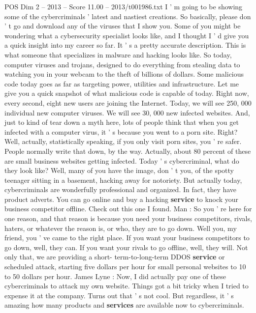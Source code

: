 \begin{textsample}{POS Dim 2 – 2013 – Score 11.00 – 2013/t001986.txt}  \label{ex:f2_pos_068}
I ' m going to be showing some of the cybercriminals ' latest and nastiest creations.
So basically, please don ' t go and download any of the viruses that I show you.
Some of you might be wondering what a cybersecurity specialist looks like, and I thought I ' d give you a quick insight into my career so far.
It ' s a pretty accurate description.
This is what someone that specializes in malware and hacking looks like.
So today, computer viruses and trojans, designed to do everything from stealing data to watching you in your webcam to the theft of billions of dollars.
Some malicious code today goes as far as targeting power, utilities and infrastructure.
Let me give you a quick snapshot of what malicious code is capable of today.
Right now, every second, eight new users are joining the Internet.
Today, we will see 250, 000 individual new computer viruses.
We will see 30, 000 new infected websites.
And, just to kind of tear down a myth here, lots of people think that when you get infected with a computer virus, it ' s because you went to a porn site.
Right?
Well, actually, statistically speaking, if you only visit porn sites, you ' re safer.
People normally write that down, by the way.
Actually, about 80 percent of these are small business websites getting infected.
Today ' s cybercriminal, what do they look like?
Well, many of you have the image, don ' t you, of the spotty teenager sitting in a basement, hacking away for notoriety.
But actually today, cybercriminals are wonderfully professional and organized.
In fact, they have product adverts.
You can go online and buy a hacking \textbf{service} to knock your business competitor offline.
Check out this one I found.
Man : So you ' re here for one reason, and that reason is because you need your business competitors, rivals, haters, or whatever the reason is, or who, they are to go down.
Well you, my friend, you ' ve came to the right place.
If you want your business competitors to go down, well, they can.
If you want your rivals to go offline, well, they will.
Not only that, we are providing a short- term-to-long-term DDOS \textbf{service} or scheduled attack, starting five dollars per hour for small personal websites to 10 to 50 dollars per hour.
James Lyne : Now, I did actually pay one of these cybercriminals to attack my own website.
Things got a bit tricky when I tried to expense it at the company.
Turns out that ' s not cool.
But regardless, it ' s amazing how many products and \textbf{services} are available now to cybercriminals.

\end{textsample}
